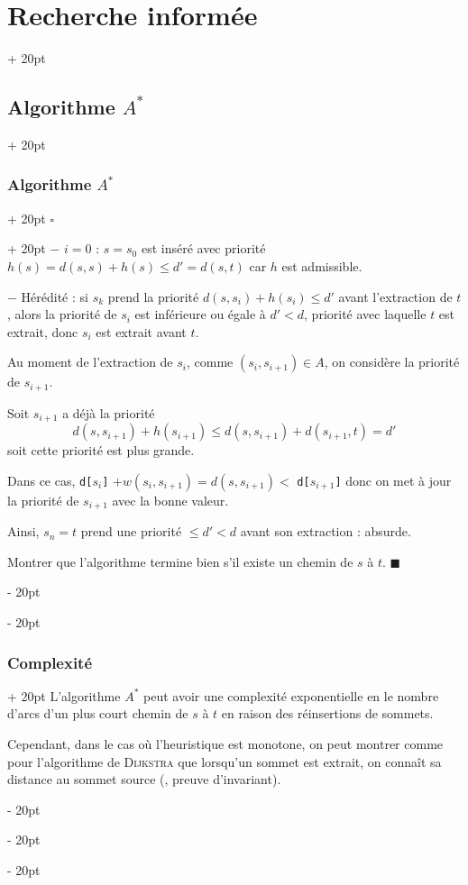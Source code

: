 \documentclass[a4paper, 12pt, twoside]{article}
\renewcommand{\le}{\leqslant}
\newcommand{\ind}[1][20pt]{\advance\leftskip + #1}
\newcommand{\deind}[1][20pt]{\advance\leftskip - #1}
\newenvironment{indt}[2][20pt]{#2 \par \ind[#1]}{\par \deind} %
\newenvironment{proof}[1][{}]{\begin{indt}{$\square$ #1}}{$\blacksquare$ \end{indt}}
\begin{document}
\begin{indt}{\section{Recherche informée}}
\begin{indt}{\subsection{Algorithme $A^*$}}
\begin{indt}{\subsubsection{Algorithme $A^*$}}
\begin{proof}
                    $-$ $i = 0$ : $s = s_0$ est inséré avec priorité $h(s) = d(s, s) + h(s) \le d' = d(s, t)$ car $h$ est admissible.

                    $-$ Hérédité : si $s_k$ prend la priorité $d(s, s_i) + h(s_i) \le d'$ avant l'extraction de $t$, alors la priorité de $s_i$ est inférieure ou égale à $d' < d$, priorité avec laquelle $t$ est extrait, donc $s_i$ est extrait avant $t$.

                    Au moment de l'extraction de $s_i$, comme $(s_i, s_{i + 1}) \in A$, on considère la priorité de $s_{i + 1}$.

                    Soit $s_{i + 1}$ a déjà la priorité
                    \[
                        d(s, s_{i + 1}) + h(s_{i + 1})
                        \le d(s, s_{i + 1}) + d(s_{i + 1}, t)
                        = d'
                    \]
                    soit cette priorité est plus grande.

                    Dans ce cas, \texttt{d[$s_i$]} $ + w(s_i, s_{i + 1}) = d(s, s_{i + 1}) <$ \texttt{d[$s_{i + 1}$]} donc on met à jour la priorité de $s_{i + 1}$ avec la bonne valeur.

                    Ainsi, $s_n = t$ prend une priorité $\le d' < d$ avant son extraction : absurde.

                    \vspace{6pt}
                    
                     Montrer que l'algorithme termine bien s'il existe un chemin de $s$ à $t$.
                \end{proof}
            \end{indt}

            \vspace{12pt}
            
            \begin{indt}{\subsubsection{Complexité}}
                L'algorithme $A^*$ peut avoir une complexité exponentielle en le nombre d'arcs d'un plus court chemin de $s$ à $t$ en raison des réinsertions de sommets.

                Cependant, dans le cas où l'heuristique est monotone, on peut montrer comme pour l'algorithme de \textsc{Dijkstra} que lorsqu'un sommet est extrait, on connaît sa distance au sommet source (, preuve d'invariant).


\end{indt}
\end{indt}
\end{indt}
\end{document}

